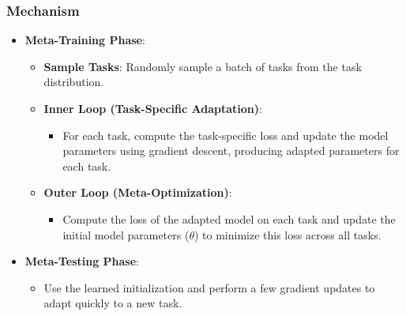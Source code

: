 \documentclass{ieeeojies}
\begin{document}
\subsubsection*{\textbf{Mechanism}}
\begin{itemize}
    \item \textbf{Meta-Training Phase}:
    \begin{itemize}
        \item \textbf{Sample Tasks}: Randomly sample a batch of tasks from the task distribution.
        \item \textbf{Inner Loop (Task-Specific Adaptation)}:
        \begin{itemize}
            \item For each task, compute the task-specific loss and update the model parameters using gradient descent, producing adapted parameters for each task.
        \end{itemize}
        \item \textbf{Outer Loop (Meta-Optimization)}:
        \begin{itemize}
            \item Compute the loss of the adapted model on each task and update the initial model parameters ($\theta$) to minimize this loss across all tasks.
        \end{itemize}
    \end{itemize}
    \item \textbf{Meta-Testing Phase}:
    \begin{itemize}
        \item Use the learned initialization and perform a few gradient updates to adapt quickly to a new task.
    \end{itemize}
\end{itemize}
\end{document}
